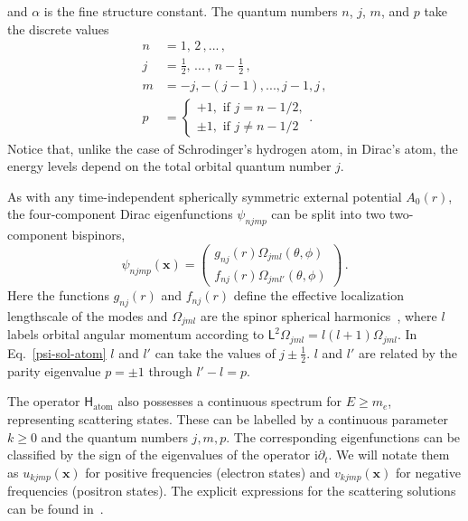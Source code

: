 \documentclass[letterpaper,12pt,titlepage,oneside,final]{book}
\newcommand{\mf}{\mathsf}%
\newcommand{\ii}{\mathrm{i}}
\begin{document}
and $\alpha$ is the fine structure constant. The quantum numbers $n$, $j$, $m$, and $p$ take the discrete values
\begin{align}\label{Dirac-atom-eigenvalues}
    n &= 1,\,2\,,...\,,\\
    j &= \frac{1}{2},\,...\,,\,n-\frac{1}{2}\,, \\
    m &= -j, -(j-1), ..., j-1, j \, , \\
    p &= \begin{cases}
        +1, \text{ if } j = n - 1/2,\\
        \pm 1, \text{ if } j \neq n - 1/2        
    \end{cases} .
\end{align}
Notice that, unlike the case of Schrodinger's hydrogen atom, in Dirac's atom, the energy levels depend on the total orbital quantum number $j$.

As with any time-independent spherically symmetric external potential $A_0(r)$, the four-component Dirac eigenfunctions $\psi_{njmp}$ can be split into two two-component bispinors,
\begin{equation}\label{psi-sol-atom}
    \psi_{njmp}(\bm x) = \begin{pmatrix}
        g_{nj}(r)\Omega_{jml}(\theta,\phi)\\
        f_{nj}(r)\Omega_{jml'}(\theta,\phi)
    \end{pmatrix} \, .
\end{equation}
Here the functions $g_{nj}(r)$ and $f_{nj}(r)$ define the effective localization lengthscale of the modes and $\Omega_{jml}$ are the spinor spherical harmonics~\cite{RQMgreiner, spinorsphericalharmonics}, where $l$ labels orbital angular momentum according to $\bm{\mf{L}}^2\Omega_{jml} = l(l+1)\Omega_{jml}$. In Eq.~\eqref{psi-sol-atom} $l$ and $l'$ can take the values of $j \pm \tfrac{1}{2}$. $l$ and $l'$ are related by the parity eigenvalue $p = \pm 1$ through $l' - l =  p$.  

The operator $\mf{H}_\text{atom}$ also possesses a continuous spectrum for $E\geq m_e$, representing scattering states. These can be labelled by a continuous parameter $k\geq 0$ and the quantum numbers $j,m,p$. The corresponding eigenfunctions can be classified by the sign of the eigenvalues of the operator $\ii \partial_t$. We will notate them as $u_{kjmp}(\bm x)$ for positive frequencies (electron states) and $v_{kjmp}(\bm x)$ for negative frequencies (positron states). The explicit expressions for the scattering solutions can be found in~\cite{RQMgreiner}.
\end{document}
